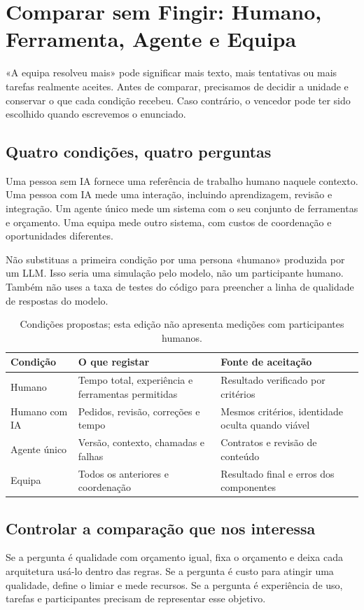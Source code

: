 \chapter{Comparar sem Fingir: Humano, Ferramenta, Agente e Equipa}
\label{ch:comparar}

«A equipa resolveu mais» pode significar mais texto, mais tentativas ou mais tarefas realmente aceites. Antes de comparar, precisamos de decidir a unidade e conservar o que cada condição recebeu. Caso contrário, o vencedor pode ter sido escolhido quando escrevemos o enunciado.

\section{Quatro condições, quatro perguntas}
Uma pessoa sem IA fornece uma referência de trabalho humano naquele contexto. Uma pessoa com IA mede uma interação, incluindo aprendizagem, revisão e integração. Um agente único mede um sistema com o seu conjunto de ferramentas e orçamento. Uma equipa mede outro sistema, com custos de coordenação e oportunidades diferentes.

Não substituas a primeira condição por uma persona «humano» produzida por um LLM. Isso seria uma simulação pelo modelo, não um participante humano. Também não uses a taxa de testes do código para preencher a linha de qualidade de respostas do modelo.

\begin{table}[htbp]
\small
\begin{tabularx}{\textwidth}{@{}lXX@{}}
\toprule
Condição & O que registar & Fonte de aceitação \\
\midrule
Humano & Tempo total, experiência e ferramentas permitidas & Resultado verificado por critérios \\
Humano com IA & Pedidos, revisão, correções e tempo & Mesmos critérios, identidade oculta quando viável \\
Agente único & Versão, contexto, chamadas e falhas & Contratos e revisão de conteúdo \\
Equipa & Todos os anteriores e coordenação & Resultado final e erros dos componentes \\
\bottomrule
\end{tabularx}
\caption{Condições propostas; esta edição não apresenta medições com participantes humanos.}
\end{table}

\section{Controlar a comparação que nos interessa}
Se a pergunta é qualidade com orçamento igual, fixa o orçamento e deixa cada arquitetura usá-lo dentro das regras. Se a pergunta é custo para atingir uma qualidade, define o limiar e mede recursos. Se a pergunta é experiência de uso, tarefas e participantes precisam de representar esse objetivo.

